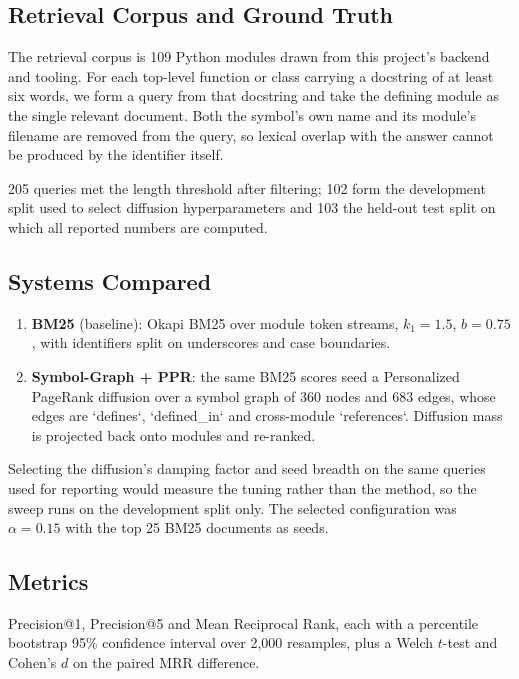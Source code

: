\documentclass[10pt,journal,compsoc,twocolumn]{IEEEtran}
\begin{document}
\subsection{Retrieval Corpus and Ground Truth}


The retrieval corpus is 109 Python modules drawn from this project's backend and tooling. For each top-level function or class carrying a docstring of at least six words, we form a query from that docstring and take the defining module as the single relevant document. Both the symbol's own name and its module's filename are removed from the query, so lexical overlap with the answer cannot be produced by the identifier itself.

205 queries met the length threshold after filtering; 102 form the development split used to select diffusion hyperparameters and 103 the held-out test split on which all reported numbers are computed.


\subsection{Systems Compared}


\begin{enumerate}
  \item \textbf{BM25} (baseline): Okapi BM25 over module token streams, $k_1 = 1.5$, $b = 0.75$, with identifiers split on underscores and case boundaries.
  \item \textbf{Symbol-Graph + PPR}: the same BM25 scores seed a Personalized PageRank diffusion over a symbol graph of 360 nodes and 683 edges, whose edges are `defines`, `defined\_in` and cross-module `references`. Diffusion mass is projected back onto modules and re-ranked.
\end{enumerate}

Selecting the diffusion's damping factor and seed breadth on the same queries used for reporting would measure the tuning rather than the method, so the sweep runs on the development split only. The selected configuration was $\alpha = 0.15$ with the top 25 BM25 documents as seeds.


\subsection{Metrics}


Precision@1, Precision@5 and Mean Reciprocal Rank, each with a percentile bootstrap 95\% confidence interval over 2,000 resamples, plus a Welch $t$-test and Cohen's $d$ on the paired MRR difference.
\end{document}
